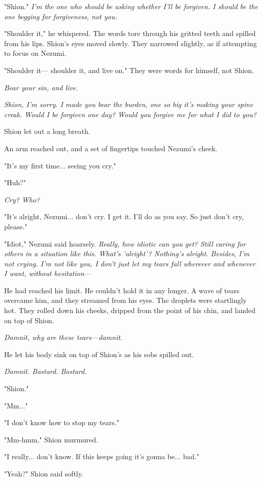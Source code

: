 "Shion." \emph{I'm the one who should be asking whether I'll be forgiven. I
should be the one begging for forgiveness, not you.}

"Shoulder it," he whispered. The words tore through his gritted teeth
and spilled from his lips. Shion's eyes moved slowly. They narrowed
slightly, as if attempting to focus on Nezumi.

"Shoulder it--- shoulder it, and live on." They were words for himself,
not Shion.

\emph{Bear your sin, and live.}

\emph{Shion, I'm sorry. I made you bear the burden, one so big it's making
your spine creak. Would I be forgiven one day? Would you forgive me for
what I did to you?}

Shion let out a long breath.

An arm reached out, and a set of fingertips touched Nezumi's cheek.

"It's my first time... seeing you cry."

"Huh?"

\emph{Cry? Who?}

"It's alright, Nezumi... don't cry. I get it. I'll do as you say. So
just don't cry, please."

"Idiot," Nezumi said hoarsely. \emph{Really, how idiotic can you get? Still
caring for others in a situation like this. What's 'alright'? Nothing's
alright. Besides, I'm not crying. I'm not like you, I don't just let my
tears fall wherever and whenever I want, without hesitation---}

He had reached his limit. He couldn't hold it in any longer. A wave of
tears overcame him, and they streamed from his eyes. The droplets were
startlingly hot. They rolled down his cheeks, dripped from the point of
his chin, and landed on top of Shion.

\emph{Damnit, why are these tears---damnit.}

He let his body sink on top of Shion's as his sobs spilled out.

\emph{Damnit. Bastard. Bastard.}

"Shion."

"Mm..."

"I don't know how to stop my tears."

"Mm-hmm," Shion murmured.

"I really... don't know. If this keeps going it's gonna be... bad."

"Yeah?" Shion said softly.

